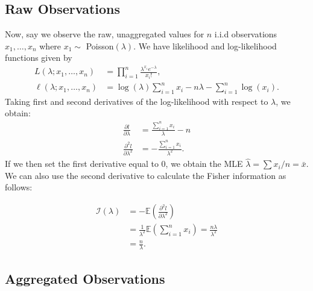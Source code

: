 \documentclass[11pt,a4,twosided,singlespacing,titlepagenumber=on,numbers=endperiod]{scrreprt}
\numberwithin{equation}{chapter} %
\theoremstyle{remark}
\begin{document}
\subsection{Raw Observations}
Now, say we observe the raw, unaggregated values for $n$ i.i.d observations $x_1, \dots, x_n$ where $x_1 \sim$ Poisson$(\lambda)$. We have likelihood and log-likelihood functions given by
\begin{equation*}
	\begin{aligned}
		L(\lambda; x_1, \dots, x_n) &= \prod_{i=1}^n \frac{\lambda^{x_i} e^{-\lambda}}{x_i!} , \\
		\ell(\lambda ; x_1, \dots, x_n) &= \log(\lambda) \sum_{i=1}^n{x_i} - n \lambda - \sum_{i=1}^n{\log(x_i)}.
	\end{aligned}
\end{equation*}
Taking first and second derivatives of the log-likelihood with respect to $\lambda$, we obtain:
\begin{equation*}
	\begin{aligned}
		\frac{\partial l}{\partial \lambda} &= \frac{\sum_{i=1}^n{x_i}}{\lambda} - n \\
		\frac{\partial^2 l}{\partial \lambda^2} &= -\frac{\sum_{i=1}^n{x_i}}{\lambda^2}.
	\end{aligned}
\end{equation*}
If we then set the first derivative equal to 0, we obtain the MLE $\hat{\lambda} = \sum{x_i}/n = \bar{x}$. We can also use the second derivative to calculate the Fisher information as follows:

\begin{equation*}
	\begin{aligned}
		\mathcal{I}(\lambda) &= -\mathbb{E}\left(\frac{\partial^2 l}{\partial \lambda^2} \right) \\
		&= \frac{1}{\lambda^2}\mathbb{E} \left(\sum_{i=1}^n x_i \right) = \frac{n \lambda}{\lambda^2} \\
		&= \frac{n}{\lambda}.
	\end{aligned}
\end{equation*}

\subsection{Aggregated Observations}
\end{document}
